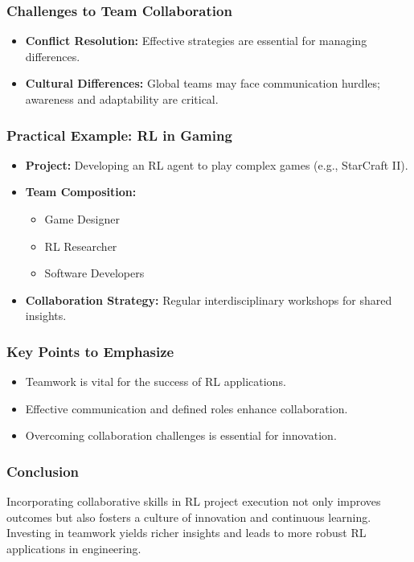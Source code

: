 \documentclass[aspectratio=169]{beamer}
\begin{document}
\begin{frame}[fragile]
    \frametitle{Challenges to Team Collaboration}
    \begin{itemize}
        \item \textbf{Conflict Resolution:} Effective strategies are essential for managing differences.
        \item \textbf{Cultural Differences:} Global teams may face communication hurdles; awareness and adaptability are critical.
    \end{itemize}
\end{frame}

\begin{frame}[fragile]
    \frametitle{Practical Example: RL in Gaming}
    \begin{itemize}
        \item \textbf{Project:} Developing an RL agent to play complex games (e.g., StarCraft II).
        \item \textbf{Team Composition:}
            \begin{itemize}
                \item Game Designer
                \item RL Researcher
                \item Software Developers
            \end{itemize}
        \item \textbf{Collaboration Strategy:} Regular interdisciplinary workshops for shared insights.
    \end{itemize}
\end{frame}

\begin{frame}[fragile]
    \frametitle{Key Points to Emphasize}
    \begin{itemize}
        \item Teamwork is vital for the success of RL applications.
        \item Effective communication and defined roles enhance collaboration.
        \item Overcoming collaboration challenges is essential for innovation.
    \end{itemize}
\end{frame}

\begin{frame}[fragile]
    \frametitle{Conclusion}
    Incorporating collaborative skills in RL project execution not only improves outcomes but also fosters a culture of innovation and continuous learning. 
    Investing in teamwork yields richer insights and leads to more robust RL applications in engineering.
\end{frame}
\end{document}
